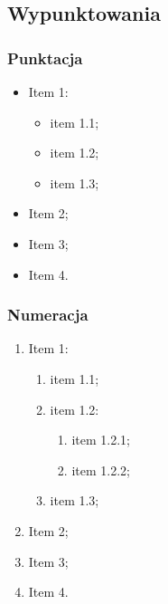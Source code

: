 \subsection{Wypunktowania}
\subsubsection{Punktacja}

\begin{itemize}
    \item Item 1:
    \begin{itemize}
        \item item 1.1;
        \item item 1.2;
        \item item 1.3;
    \end{itemize}
    \item Item 2;
    \item Item 3;
    \item Item 4.
\end{itemize}


\subsubsection{Numeracja}
\begin{enumerate}
    \item Item 1:
    \begin{enumerate}
        \item item 1.1;
        \item item 1.2:
        \begin{enumerate}
            \item item 1.2.1;
            \item item 1.2.2;
        \end{enumerate}
        \item item 1.3;
    \end{enumerate}
    \item Item 2;
    \item Item 3;
    \item Item 4.
\end{enumerate}

 

